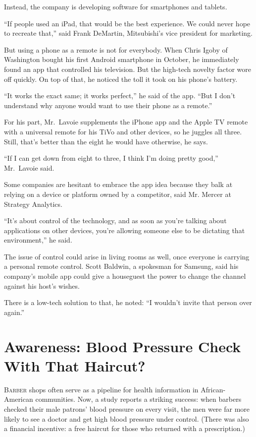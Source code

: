 ﻿\documentclass[12pt]{article}
\begin{document}
Instead, the company is developing software for smartphones and tablets.

``If people used an iPad, that would be the best experience. We could never hope to recreate that,''
said Frank DeMartin, Mitsubishi's vice president for marketing.

But using a phone as a remote is not for everybody. When Chris Igoby of Washington bought his first
Android smartphone in October, he immediately found an app that controlled his television. But the
high-tech novelty factor wore off quickly. On top of that, he noticed the toll it took on his
phone's battery.

``It works the exact same; it works perfect,'' he said of the app. ``But I don't understand why
anyone would want to use their phone as a remote.''

For his part, Mr.~Lavoie supplements the iPhone app and the Apple TV remote with a universal remote
for his TiVo and other devices, so he juggles all three. Still, that's better than the eight he
would have otherwise, he says.

``If I can get down from eight to three, I think I'm doing pretty good,'' Mr.~Lavoie said.

Some companies are hesitant to embrace the app idea because they balk at relying on a device or
platform owned by a competitor, said Mr. Mercer at Strategy Analytics.

``It's about control of the technology, and as soon as you're talking about applications on other
devices, you're allowing someone else to be dictating that environment,'' he said.

The issue of control could arise in living rooms as well, once everyone is carrying a personal
remote control. Scott Baldwin, a spokesman for Samsung, said his company's mobile app could give a
houseguest the power to change the channel against his host's wishes.

There is a low-tech solution to that, he noted: ``I wouldn't invite that person over again.''


\section{Awareness: Blood Pressure Check With That Haircut?}

\lettrine{B}{arber} shops often serve as a pipeline for health information
in African-American communities. Now, a study reports a striking success: when barbers checked their
male patrons' blood pressure on every visit, the men were far more likely to see a doctor and get
high blood pressure under control. (There was also a financial incentive: a free haircut for those
who returned with a prescription.)
\end{document}
